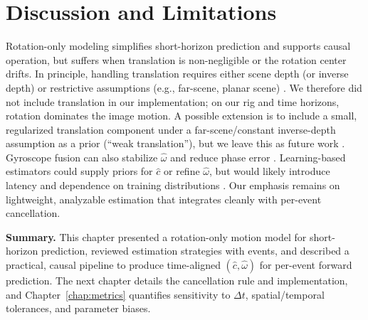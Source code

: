\section{Discussion and Limitations}
Rotation-only modeling simplifies short-horizon prediction and supports causal operation, but suffers when translation is non-negligible or the rotation center drifts. In principle, handling translation requires either scene depth (or inverse depth) or restrictive assumptions (e.g., far-scene, planar scene) \cite{Gallego2020Survey,Gallego2018CMax,Rebecq2017EVO,Benosman2014Epipolar}. We therefore did not include translation in our implementation; on our rig and time horizons, rotation dominates the image motion. A possible extension is to include a small, regularized translation component under a far-scene/constant inverse-depth assumption as a prior (``weak translation''), but we leave this as future work \cite{Gallego2020Survey}. Gyroscope fusion can also stabilize $\hat\omega$ and reduce phase error \cite{Rebecq2017EVO}. Learning-based estimators could supply priors for $\hat c$ or refine $\hat\omega$, but would likely introduce latency and dependence on training distributions \cite{Zhu2018FlowNet,Zhu2019Unsupervised}. Our emphasis remains on lightweight, analyzable estimation that integrates cleanly with per-event cancellation.

\medskip
\noindent\textbf{Summary.} This chapter presented a rotation-only motion model for short-horizon prediction, reviewed estimation strategies with events, and described a practical, causal pipeline to produce time-aligned $(\hat c,\hat\omega)$ for per-event forward prediction. The next chapter details the cancellation rule and implementation, and Chapter~\ref{chap:metrics} quantifies sensitivity to $\Delta t$, spatial/temporal tolerances, and parameter biases.
